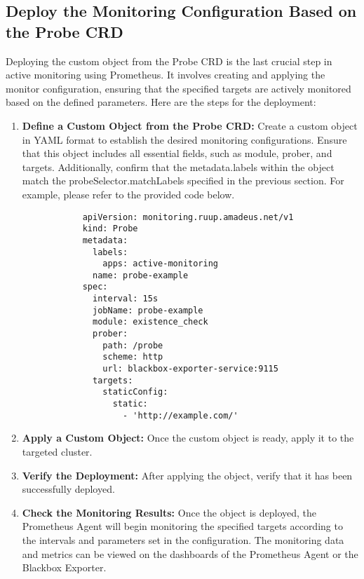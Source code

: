 \subsection{Deploy the Monitoring Configuration Based on the Probe \ac{CRD}}

Deploying the custom object from the Probe \ac{CRD} is the last crucial step in active monitoring using Prometheus. It involves creating and applying the monitor configuration, ensuring that the specified targets are actively monitored based on the defined parameters. Here are the steps for the deployment:

\begin{enumerate}
    \item \textbf{Define a Custom Object from the Probe \ac{CRD}:}
    Create a custom object in YAML format to establish the desired monitoring configurations. Ensure that this object includes all essential fields, such as module, prober, and targets. Additionally, confirm that the metadata.labels within the object match the probeSelector.matchLabels specified in the previous section. For example, please refer to the provided code below. 
        \lstset{upquote=true}
        \begin{lstlisting}
            apiVersion: monitoring.ruup.amadeus.net/v1
            kind: Probe
            metadata:
              labels:
                apps: active-monitoring
              name: probe-example
            spec:
              interval: 15s
              jobName: probe-example
              module: existence_check
              prober:
                path: /probe
                scheme: http
                url: blackbox-exporter-service:9115
              targets:
                staticConfig:
                  static:
                    - 'http://example.com/'
        \end{lstlisting}
    \item \textbf{Apply a Custom Object:}
    Once the custom object is ready, apply it to the targeted cluster. 
    \item \textbf{Verify the Deployment:}
    After applying the object, verify that it has been successfully deployed. 
    \item \textbf{Check the Monitoring Results:}
    Once the object is deployed, the Prometheus Agent will begin monitoring the specified targets according to the intervals and parameters set in the configuration. The monitoring data and metrics can be viewed on the dashboards of the Prometheus Agent or the Blackbox Exporter. 
\end{enumerate}

